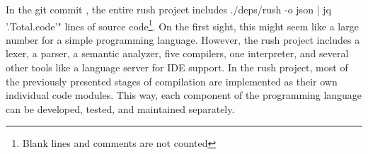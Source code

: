 \def\commit{}
In the git commit \rushCommit, the entire rush project includes
 ./deps/rush -o json | jq '.Total.code'" lines of source code\footnote{Blank lines and comments are not counted}.
On the first sight, this might seem like a large number for a simple programming language.
However, the rush project includes a lexer, a parser, a semantic analyzer, five compilers, one interpreter, and several other tools like a language server for IDE support.
In the rush project, most of the previously presented stages of compilation are implemented as their own individual code modules.
This way, each component of the programming language can be developed, tested, and maintained separately.
